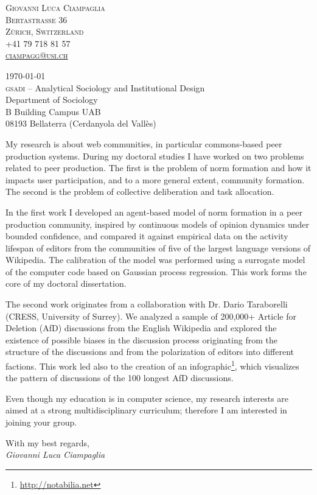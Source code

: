 \documentclass[11pt, a4paper]{article}
\begin{document}
\center
\textsc{Giovanni Luca Ciampaglia\\
Bertastraße 36\\
 Zürich, Switzerland\\
+41 79 718 81 57\\
\href{mailto:ciampagg@usi.ch}{ciampagg@usi.ch}
}

\raggedright
\vspace{0.5in}
\today\\[2em]

\textsc{gsadi} -- Analytical Sociology and Institutional Design\\
Department of Sociology\\ 
B Building Campus UAB \\
08193 Bellaterra (Cerdanyola del Vallès)\\
\vspace{2em}


My research is about web communities, in particular commons-based peer
production systems. During my doctoral studies I have worked on two problems
related to peer production. The first is the problem of norm formation and how
it impacts user participation, and to a more general extent, community
formation. The second is the problem of collective deliberation and task
allocation.

In the first work I developed an agent-based model of norm formation in a peer
production community, inspired by continuous models of opinion dynamics under
bounded confidence, and compared it against empirical data on the activity
lifespan of editors from the communities of five of the largest language
versions of Wikipedia. The calibration of the model was performed using a
surrogate model of the computer code based on Gaussian process regression. This
work forms the core of my doctoral dissertation.

The second work originates from a collaboration with Dr. Dario Taraborelli
(CRESS, University of Surrey). We analyzed a sample of 200,000+ Article for
Deletion (AfD) discussions from the English Wikipedia and explored the existence
of possible biases in the discussion process originating from the structure of
the discussions and from the polarization of editors into different factions.
This work led also to the creation of an
infographic\footnote{\url{http://notabilia.net}}, which visualizes the pattern
of discussions of the 100 longest AfD discussions.

Even though my education is in computer science, my research interests are
aimed at a strong multidisciplinary curriculum; therefore I am interested in
joining your group.

\vfill
\raggedleft
With my best regards,\\
\emph{Giovanni Luca Ciampaglia}
\end{document}
